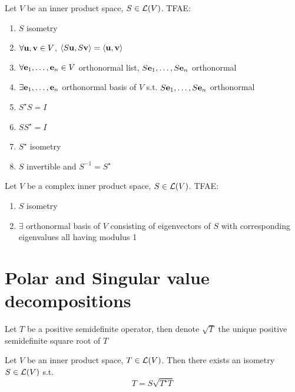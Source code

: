 \documentclass[aspectratio=169]{beamer}
\begin{document}
\begin{frame}
\begin{importanttheorem}
Let $V$ be an inner product space, $S\in\mathcal{L}(V)$. TFAE:
\begin{enumerate}
\item $S$ isometry
\item $\forall\mathbf{u},\mathbf{v}\in V$, $\langle S\mathbf{u},S\mathbf{v}\rangle =\langle \mathbf{u},\mathbf{v}\rangle$
\item $\forall\mathbf{e}_1,\ldots,\mathbf{e}_n\in V$ orthonormal list, $S\mathbf{e}_1,\ldots,S\mathbf{e}_n$ orthonormal 
\item $\exists \mathbf{e}_1,\ldots,\mathbf{e}_n$ orthonormal basis of $V$ s.t. $S\mathbf{e}_1,\ldots,S\mathbf{e}_n$ orthonormal
\item $S^\star S=I$
\item $SS^\star =I$
\item $S^\star $ isometry
\item $S$ invertible and $S^{-1}=S^\star $
\end{enumerate}
\end{importanttheorem}
\end{frame}


\begin{frame}
\begin{theorem}[Isometries when $\IF=\IC$]
Let $V$ be a complex inner product space, $S\in\mathcal{L}(V)$. TFAE:
\begin{enumerate}
\item $S$ isometry
\item $\exists$ orthonormal basis of $V$ consisting of eigenvectors of $S$ with corresponding eigenvalues all having modulus 1
\end{enumerate}
\end{theorem}
\end{frame}


\section{Polar and Singular value decompositions}

\begin{frame}
Let $T$ be a positive semidefinite operator, then denote $\sqrt{T}$ the unique positive semidefinite square root of $T$
\vfill
\begin{theorem}
Let $V$ be an inner product space, $T\in\mathcal{L}(V)$. Then there exists an isometry $S\in\mathcal{L}(V)$ s.t.
\[
T=S\sqrt{T^\star T}
\]
\end{theorem}
\end{frame}
\end{document}
